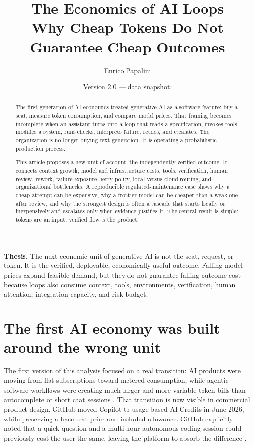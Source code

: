 \documentclass[11pt]{article}
\title{\vspace{-1.2cm}\textbf{The Economics of AI Loops}\\[0.25em]
\large Why Cheap Tokens Do Not Guarantee Cheap Outcomes}
\author{Enrico Papalini}
\date{Version 2.0 --- data snapshot: \SnapshotDate{}}
\begin{document}
\maketitle

\begin{abstract}
The first generation of AI economics treated generative AI as a software feature: buy a seat, measure token consumption, and compare model prices. That framing becomes incomplete when an assistant turns into a loop that reads a specification, invokes tools, modifies a system, runs checks, interprets failure, retries, and escalates. The organization is no longer buying text generation. It is operating a probabilistic production process.

This article proposes a new unit of account: the independently verified outcome. It connects context growth, model and infrastructure costs, tools, verification, human review, rework, failure exposure, retry policy, local-versus-cloud routing, and organizational bottlenecks. A reproducible regulated-maintenance case shows why a cheap attempt can be expensive, why a frontier model can be cheaper than a weak one after review, and why the strongest design is often a cascade that starts locally or inexpensively and escalates only when evidence justifies it. The central result is simple: tokens are an input; verified flow is the product.
\end{abstract}

\begin{thesisbox}
\textbf{Thesis.} The next economic unit of generative AI is not the seat, request, or token. It is the verified, deployable, economically useful outcome. Falling model prices expand feasible demand, but they do not guarantee falling outcome cost because loops also consume context, tools, environments, verification, human attention, integration capacity, and risk budget.
\end{thesisbox}

\section{The first AI economy was built around the wrong unit}

The first version of this analysis focused on a real transition: AI products were moving from flat subscriptions toward metered consumption, while agentic software workflows were creating much larger and more variable token bills than autocomplete or short chat sessions \cite{papaliniV1}. That transition is now visible in commercial product design. GitHub moved Copilot to usage-based AI Credits in June 2026, while preserving a base seat price and included allowance. GitHub explicitly noted that a quick question and a multi-hour autonomous coding session could previously cost the user the same, leaving the platform to absorb the difference \cite{githubCreditsAnnouncement,githubCreditsDocs}.
\end{document}
